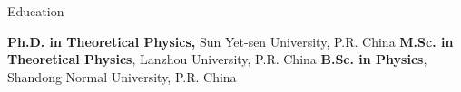 \begin{rubric}{Education}

\entry*[2017 -- 2020]%
    \textbf{Ph.D. in Theoretical Physics,} Sun Yet-sen University, P.R. China 
%
\entry*[2013 -- 2016]%
    \textbf{M.Sc. in Theoretical Physics}, Lanzhou University, P.R. China %
\entry*[2009 -- 2013]%
    \textbf{B.Sc. in Physics}, Shandong Normal University, P.R. China %
\end{rubric}

